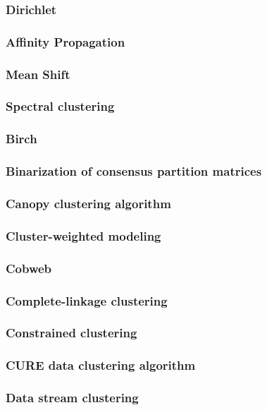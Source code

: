 \documentclass[draft]{VUMIFInfKursinis}
\begin{document}
\subsubsection{Dirichlet}

\subsubsection{Affinity Propagation}
\subsubsection{Mean Shift}
\subsubsection{Spectral clustering}
\subsubsection{Birch}


\subsubsection{Binarization of consensus partition matrices}
\subsubsection{Canopy clustering algorithm}
\subsubsection{Cluster-weighted modeling}
\subsubsection{Cobweb}
\subsubsection{Complete-linkage clustering}
\subsubsection{Constrained clustering}
\subsubsection{CURE data clustering algorithm}
\subsubsection{Data stream clustering}
\end{document}
